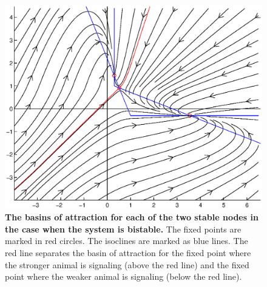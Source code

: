 \documentclass{article}
\begin{document}
\begin{figure}
\begin{center}
\includegraphics[width=6in]{basins_of_attraction.eps}
\end{center}
\caption{{\bf The basins of attraction for each of the two stable nodes in the case when the system is bistable.} The fixed points are marked in red circles.  The isoclines are marked as blue lines.  The red line separates the basin of attraction for the fixed point where the stronger animal is signaling (above the red line) and the fixed point where the weaker animal is signaling (below the red line). \label{basins}}
\end{figure}
\end{document}
